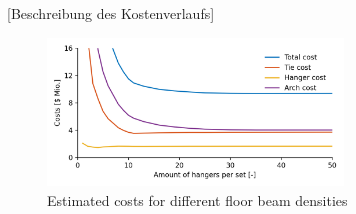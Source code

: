 [Beschreibung des Kostenverlaufs]

\begin{figure}[H]
    \centering
    \includegraphics[width=0.7\textwidth]{calculations/floor beam comparison/cost comparison.png}
    \caption{Estimated costs for different floor beam densities}
    \label{fig:fb_costs}
\end{figure}
